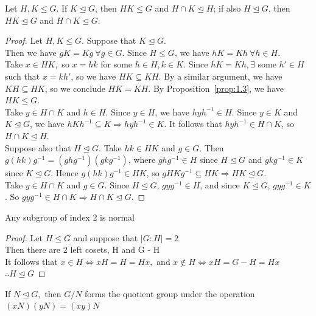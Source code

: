 \documentclass[../Odyssey_Project.tex]{subfiles}
\begin{document}
\begin{proposition}
\label{prop:1.7}
Let $H, K \leq G$. If $K \trianglelefteq G$, then $HK \leq G$ and $H \cap K \trianglelefteq H$; if also $H \trianglelefteq G$, then $HK \trianglelefteq G$ and $H \cap K \trianglelefteq G$.
\end{proposition}
\begin{proof}
    Let \(H, K \leq G\). Suppose that \(K \trianglelefteq G\). \\
    Then we have \(gK = Kg \ \forall g \in G\). Since \(H \leq G\), we have \(hK = Kh \ \forall h \in H\). \\
    Take \(x \in HK,\) so \(x = hk\) for some \(h \in H, k \in K\). Since \(hK = Kh, \exists\) some \(h' \in H\) such that \(x = kh'\), so we have \(HK \subseteq KH\). By a similar argument, we have \(KH \subseteq HK\), so we conclude \(HK = KH\). By Proposition~\ref{prop:1.3}, we have \(HK \leq G\). \\
    Take \(y \in H \cap K\) and \(h \in H\). Since \(y \in H\), we have \(hyh^{-1} \in H\). Since \(y \in K\) and \(K \trianglelefteq G\), we have \(hKh^{-1} \subseteq K \Rightarrow hyh^{-1} \in K\). It follows that \(hyh^{-1} \in H \cap K\), so \(H \cap K \trianglelefteq H\). \\
    Suppose also that \(H \trianglelefteq G\). Take \(hk \in HK\) and \(g \in G\). Then \(g(hk)g^{-1} = (ghg^{-1})(gkg^{-1})\), where \(ghg^{-1} \in H\) since \(H \trianglelefteq G\) and \(gkg^{-1} \in K\) since \(K \trianglelefteq G\). Hence \(g(hk)g^{-1} \in HK\), so \(gHKg^{-1} \subseteq HK \Rightarrow HK \trianglelefteq G\). \\
    Take \(y \in H \cap K\) and \(g \in G\). Since \(H \trianglelefteq G\), \(gyg^{-1} \in H\), and since \(K \trianglelefteq G\), \(gyg^{-1} \in K\). So \(gyg^{-1} \in H \cap K \Rightarrow H \cap K \trianglelefteq G\).
\end{proof}
\begin{proposition}
\label{prop:1.8}
Any subgroup of index 2 is normal
\end{proposition}
\begin{proof}
    Let \(H \leq G\) and suppose that \(|G:H| = 2\) \\
    Then there are 2 left cosets, H and G - H \\
    It follows that \(x \in H \iff xH = H = Hx, \) and \(x \not\in H \iff xH = G - H = Hx\) \\
    \(\therefore H \trianglelefteq G\)
\end{proof}
\begin{theorem}
\label{thm:1.9}
If \(N \trianglelefteq G, \) then \(G / N\) forms the quotient group under the operation \((xN)(yN) = (xy)N\)
\end{theorem}
\end{document}
